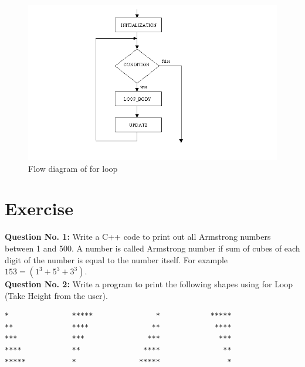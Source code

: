 \documentclass{article}
\begin{document}
\begin{figure}[H]
\centering
\label{For-Loop-Flow-Diagram}
\includegraphics[width=1.0\textwidth]{For_Loop.PNG}
\caption{Flow diagram of for loop}
\end{figure}



\section{Exercise}
\textbf{Question No. 1:} Write a C++ code to print out all Armstrong numbers between 1 and 500. A number is called Armstrong number if sum of cubes of each digit of the number is equal to the number itself. For example $153=(1^3+5^3+3^3)$.\\
\textbf{Question No. 2:} Write a program to print the following shapes using for Loop (Take Height from the user). 

\begin{verbatim}
*           	*****               *       	 *****
**          	****               **       	  ****
***         	***               ***       	   ***
****        	**               ****       	    **
*****       	*               *****       	     *
\end{verbatim}
\end{document}
